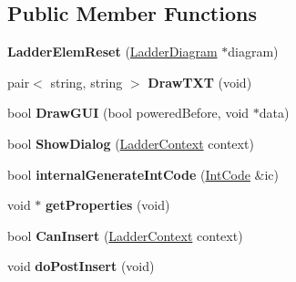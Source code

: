 \subsection*{Public Member Functions}
\begin{DoxyCompactItemize}
\item 
\hypertarget{class_ladder_elem_reset_afb99ea838eac20c7d994198b060c54a1}{{\bfseries Ladder\-Elem\-Reset} (\hyperlink{class_ladder_diagram}{Ladder\-Diagram} $\ast$diagram)}\label{class_ladder_elem_reset_afb99ea838eac20c7d994198b060c54a1}

\item 
\hypertarget{class_ladder_elem_reset_a34c8fb5eea26687095d5b2ff998581e8}{pair$<$ string, string $>$ {\bfseries Draw\-T\-X\-T} (void)}\label{class_ladder_elem_reset_a34c8fb5eea26687095d5b2ff998581e8}

\item 
\hypertarget{class_ladder_elem_reset_a0fb98ff182314c9b714e44819ee91966}{bool {\bfseries Draw\-G\-U\-I} (bool powered\-Before, void $\ast$data)}\label{class_ladder_elem_reset_a0fb98ff182314c9b714e44819ee91966}

\item 
\hypertarget{class_ladder_elem_reset_ae2ebc092fccce13c83cae4eb046c0b53}{bool {\bfseries Show\-Dialog} (\hyperlink{struct_ladder_context}{Ladder\-Context} context)}\label{class_ladder_elem_reset_ae2ebc092fccce13c83cae4eb046c0b53}

\item 
\hypertarget{class_ladder_elem_reset_ad24d9121e6ebcdfb0ac9c633e9430b4b}{bool {\bfseries internal\-Generate\-Int\-Code} (\hyperlink{class_int_code}{Int\-Code} \&ic)}\label{class_ladder_elem_reset_ad24d9121e6ebcdfb0ac9c633e9430b4b}

\item 
\hypertarget{class_ladder_elem_reset_aa4c19c79014bd821612a013a3934d766}{void $\ast$ {\bfseries get\-Properties} (void)}\label{class_ladder_elem_reset_aa4c19c79014bd821612a013a3934d766}

\item 
\hypertarget{class_ladder_elem_reset_a8f335b390d2eaca8151799d41ed92566}{bool {\bfseries Can\-Insert} (\hyperlink{struct_ladder_context}{Ladder\-Context} context)}\label{class_ladder_elem_reset_a8f335b390d2eaca8151799d41ed92566}

\item 
\hypertarget{class_ladder_elem_reset_a41053295a1edcf6fe1e1c93b77554159}{void {\bfseries do\-Post\-Insert} (void)}\label{class_ladder_elem_reset_a41053295a1edcf6fe1e1c93b77554159}


\end{DoxyCompactItemize}
